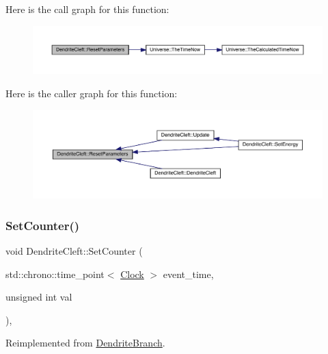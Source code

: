 Here is the call graph for this function\+:
\nopagebreak
\begin{figure}[H]
\begin{center}
\leavevmode
\includegraphics[width=350pt]{class_dendrite_cleft_a3fee388d7023cfb460412e0322244ae2_cgraph}
\end{center}
\end{figure}
Here is the caller graph for this function\+:
\nopagebreak
\begin{figure}[H]
\begin{center}
\leavevmode
\includegraphics[width=350pt]{class_dendrite_cleft_a3fee388d7023cfb460412e0322244ae2_icgraph}
\end{center}
\end{figure}
\mbox{\label{class_dendrite_cleft_a428b8e5117f381a382e0071b936d42a1}} 
\subsubsection{\texorpdfstring{Set\+Counter()}{SetCounter()}}
{\footnotesize\ttfamily void Dendrite\+Cleft\+::\+Set\+Counter (\begin{DoxyParamCaption}\item[{std\+::chrono\+::time\+\_\+point$<$ \hyperlink{universe_8h_a0ef8d951d1ca5ab3cfaf7ab4c7a6fd80}{Clock} $>$}]{event\+\_\+time,  }\item[{unsigned int}]{val }\end{DoxyParamCaption})\hspace{0.3cm}{\ttfamily [inline]}, {\ttfamily [virtual]}}



Reimplemented from \hyperlink{class_dendrite_branch_a2ce03fbad4a70564eeaafb62debd4d74}{Dendrite\+Branch}.



